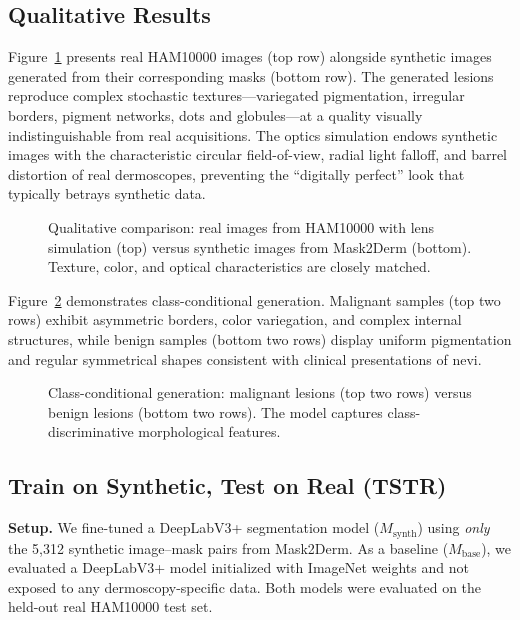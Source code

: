 \subsection{Qualitative Results}

Figure~\ref{fig:qualitative} presents real HAM10000 images (top row) alongside synthetic images generated from their corresponding masks (bottom row). The generated lesions reproduce complex stochastic textures—variegated pigmentation, irregular borders, pigment networks, dots and globules—at a quality visually indistinguishable from real acquisitions. The optics simulation endows synthetic images with the characteristic circular field-of-view, radial light falloff, and barrel distortion of real dermoscopes, preventing the ``digitally perfect'' look that typically betrays synthetic data.

\begin{figure}[t!]
    \centering
    \caption{Qualitative comparison: real images from HAM10000 with lens simulation (top) versus synthetic images from Mask2Derm (bottom). Texture, color, and optical characteristics are closely matched.}
    \label{fig:qualitative}
\end{figure}

Figure~\ref{fig:benign_malignant} demonstrates class-conditional generation. Malignant samples (top two rows) exhibit asymmetric borders, color variegation, and complex internal structures, while benign samples (bottom two rows) display uniform pigmentation and regular symmetrical shapes consistent with clinical presentations of nevi.

\begin{figure}[t!]
    \centering
    \caption{Class-conditional generation: malignant lesions (top two rows) versus benign lesions (bottom two rows). The model captures class-discriminative morphological features.}
    \label{fig:benign_malignant}
\end{figure}

\subsection{Train on Synthetic, Test on Real (TSTR)}

\textbf{Setup.} We fine-tuned a DeepLabV3+ segmentation model ($M_\text{synth}$) using \emph{only} the 5,312 synthetic image–mask pairs from Mask2Derm. As a baseline ($M_\text{base}$), we evaluated a DeepLabV3+ model initialized with ImageNet weights and not exposed to any dermoscopy-specific data. Both models were evaluated on the held-out real HAM10000 test set.

